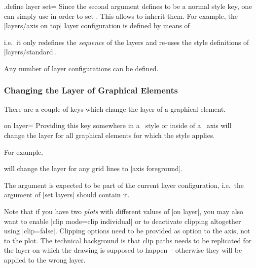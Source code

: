\begin{handler}{{.define layer set}=}
    Since the second argument  defines  to be a normal style key, one can simply use  in order to set . This allows to inherit them. For example, the |layers/axis on top| layer configuration is defined by means of
\begin{codeexample}
\end{codeexample}
    \noindent i.e.\ it only redefines the \emph{sequence} of the layers and re-uses the style definitions of |layers/standard|.

    Any number of layer configurations can be defined. 
\end{handler}


\subsubsection{Changing the Layer of Graphical Elements}
There are a couple of keys which change the layer of a graphical element. 

\begin{pgfplotskey}{on layer=}
    Providing this key somewhere in a \PGFPlots\ style or inside of a \PGFPlots\ axis will change the layer for all graphical elements for which the style applies.

    For example,
    \noindent will change the layer for any grid lines to |axis foreground|.

    The argument  is expected to be part of the current layer configuration, i.e.\ the argument of |set layers| should contain it.

	Note that if you have two \emph{plots} with different values of |on layer|, you may also want to enable |clip mode=clip individual| or to deactivate clipping altogether using |clip=false|. Clipping options need to be provided as option to the axis, not to the plot. The technical background is that clip paths needs to be replicated for the layer on which the drawing is supposed to happen -- otherwise they will be applied to the wrong layer.
\end{pgfplotskey}

